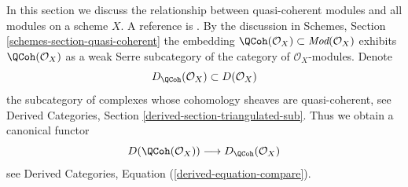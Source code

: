 \noindent
In this section we discuss the relationship between quasi-coherent
modules and all modules on a scheme $X$. A reference is
\cite[Appendix B]{TT}. By the discussion in
Schemes, Section \ref{schemes-section-quasi-coherent}
the embedding
$\QCoh(\mathcal{O}_X) \subset \textit{Mod}(\mathcal{O}_X)$
exhibits $\QCoh(\mathcal{O}_X)$ as a weak Serre subcategory of
the category of $\mathcal{O}_X$-modules. Denote
$$
D_\QCoh(\mathcal{O}_X) \subset D(\mathcal{O}_X)
$$
the subcategory of complexes whose cohomology sheaves are quasi-coherent, see
Derived Categories, Section \ref{derived-section-triangulated-sub}.
Thus we obtain a canonical functor
\begin{equation}
\label{equation-compare}
D(\QCoh(\mathcal{O}_X))
\longrightarrow
D_\QCoh(\mathcal{O}_X)
\end{equation}
see Derived Categories, Equation (\ref{derived-equation-compare}).